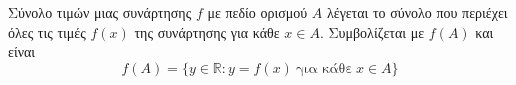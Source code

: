 Σύνολο τιμών μιας συνάρτησης $ f $ με πεδίο ορισμού $ A $ λέγεται το σύνολο που περιέχει όλες τις τιμές $ f(x) $ της συνάρτησης για κάθε  $ x\in A $. Συμβολίζεται με $ f(A) $ και είναι
\[ f(A)=\{y\in\mathbb{R}:y=f(x)\ \textrm{για κάθε}\ x\in A\} \]
